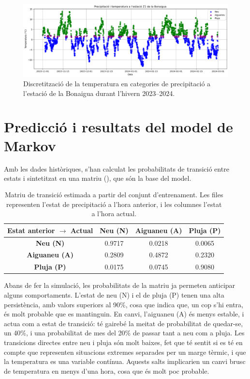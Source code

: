 \documentclass[../main.tex]{subfiles}
\begin{document}
\begin{figure}[H]
    \centering
    \includegraphics[width=\textwidth]{figures/markov/2.png}
    \caption{Discretització de la temperatura en categories de precipitació a l'estació de la Bonaigua durant l’hivern 2023–2024.}
    \label{fig:markov2}
\end{figure}

\section{Predicció i resultats del model de Markov}

Amb les dades històriques, s’han calculat les probabilitats de transició entre estats i sintetitzat en una matriu (), que són la base del model.

\begin{table}[H]
    \centering
    \renewcommand{\arraystretch}{1.3}
    \begin{tabular}{cccc}\toprule
        
        \textbf{Estat anterior $\rightarrow$ Actual} & \textbf{Neu (N)} & \textbf{Aiguaneu (A)} & \textbf{Pluja (P)} \\\midrule
        
        \textbf{Neu (N)}      & 0.9717 & 0.0218 & 0.0065 \\
        \textbf{Aiguaneu (A)} & 0.2809 & 0.4872 & 0.2320 \\
        \textbf{Pluja (P)}    & 0.0175 & 0.0745 & 0.9080 \\ \bottomrule
        
    \end{tabular}
    \caption{Matriu de transició estimada a partir del conjunt d'entrenament. Les files representen l’estat de precipitació a l’hora anterior, i les columnes l’estat a l’hora actual.}
    \label{tab:matriu transicio}
\end{table}

Abans de fer la simulació, les probabilitats de la matriu ja permeten anticipar alguns comportaments. L’estat de neu (N) i el de pluja (P) tenen una alta persistència, amb valors superiors al 90\%, cosa que indica que, un cop s’hi entra, és molt probable que es mantinguin. En canvi, l’aiguaneu (A) és menys estable, i actua com a estat de transició: té gairebé la meitat de probabilitat de quedar-se, un 40\%, i una probabilitat de mes del 20\%  de passar tant a neu com a pluja. Les transicions directes entre neu i pluja són molt baixes, fet que té sentit si es té en compte que representen situacions extremes separades per un marge tèrmic, i que la temperatura es una variable contínua. Aquests salts implicarien un canvi brusc de temperatura en menys d'una hora, cosa que és molt poc probable.
\end{document}
